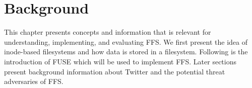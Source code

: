 \chapter{Background}

\label{ch:background}






This chapter presents concepts and information that is relevant for understanding, implementing, and evaluating \gls{FFS}. We first present the idea of inode-based filesystems and how data is stored in a filesystem. Following is the introduction of \gls{FUSE} which will be used to implement \gls{FFS}. Later sections present background information about Twitter and the potential threat adversaries of \gls{FFS}. 









